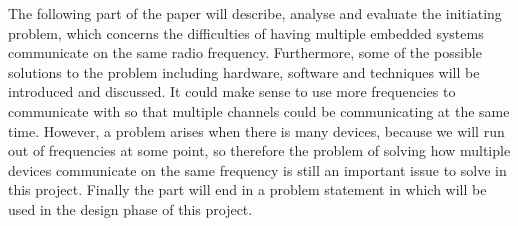 \newpage
The following part of the paper will describe, analyse and evaluate the initiating problem, which concerns the difficulties of having multiple embedded systems communicate on the same radio frequency.
Furthermore, some of the possible solutions to the problem including hardware, software and techniques will be introduced and discussed.
It could make sense to use more frequencies to communicate with so that multiple channels could be communicating at the same time.
However, a problem arises when there is many devices, because we will run out of frequencies at some point, so therefore the problem of solving how multiple devices communicate on the same frequency is still an important issue to solve in this project.
Finally the part will end in a problem statement in  which will be used in the design phase of this project.